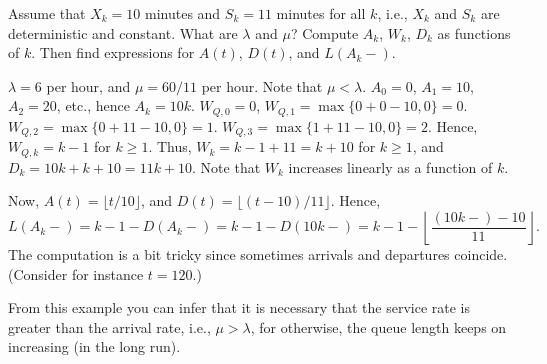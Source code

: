 \begin{extra}
 Assume that $X_k = 10$ minutes and $S_k = 11$ minutes for all
 $k$, i.e., $X_k$ and $S_k$ are deterministic and constant. What
 are $\lambda$ and $\mu$? Compute $A_k$, $W_k$, $D_k$ as functions of $k$. Then find expressions for $A(t)$, $D(t)$, and $L(A_k-)$. 
\begin{solution}
 $\lambda=6$ per hour, and $\mu=60/11$ per hour. Note that
 $\mu < \lambda$. $A_0 = 0$, $A_1=10$, $A_2=20$, etc., hence
 $A_k = 10k$. $W_{Q,0} = 0$, $W_{Q,1} = \max\{0 + 0-10,0\} = 0$.
 $W_{Q,2} = \max\{0+11-10,0\} =1$.
 $W_{Q,3} = \max\{1+11-10,0\} =2$. Hence, $W_{Q,k} = k-1$ for
 $k\geq1$. Thus, $W_k = k-1+11 = k + 10$ for $k\geq1$, and
 $D_k = 10k + k+10 = 11k+10$. Note that $W_k$ increases linearly
 as a function of $k$.

 Now, $A(t) = \lfloor t/10\rfloor$, and $D(t) = \lfloor (t-10)/11 \rfloor$. Hence,
 \begin{equation*}
 L(A_k-) = k-1 - D(A_k-) = k- 1 - D(10k-) = k- 1 - \left \lfloor \frac{(10k-)-10}{11} \right \rfloor.
 \end{equation*}
 The computation is a bit tricky since sometimes arrivals and departures coincide. (Consider for instance $t=120$.)

From this example you can infer that it is necessary that the service rate is greater than the arrival rate, i.e., $\mu > \lambda$, for otherwise, the queue length keeps on increasing (in the long run).
\end{solution}
\end{extra}

